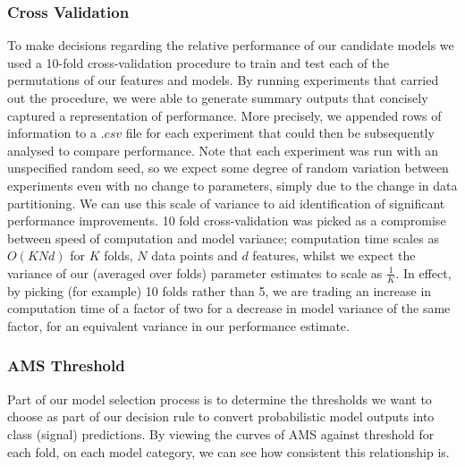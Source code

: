 \subsubsection{Cross Validation}
To make decisions regarding the relative performance of our candidate models we used a 10-fold cross-validation procedure to train and test each of the permutations of our features and models. By running experiments that carried out the procedure, we were able to generate summary outputs that concisely captured a representation of performance. More precisely, we appended rows of information to a $.csv$ file for each experiment that could then be subsequently analysed to compare performance. Note that each experiment was run with an unspecified random seed, so we expect some degree of random variation between experiments even with no change to parameters, simply due to the change in data partitioning. We can use this scale of variance to aid identification of significant performance improvements. 10 fold cross-validation was picked as a compromise between speed of computation and model variance; computation time scales as $O(KNd)$ for $K$ folds, $N$ data points and $d$ features, whilst we expect the variance of our (averaged over folds) parameter estimates to scale as $\frac{1}{K}$. In effect, by picking (for example) 10 folds rather than 5, we are trading an increase in computation time of a factor of two for a decrease in model variance of the same factor, for an equivalent variance in our performance estimate.

\subsubsection{AMS Threshold}
Part of our model selection process is to determine the thresholds we want to choose as part of our decision rule to convert probabilistic model outputs into class (signal) predictions. By viewing the curves of AMS against threshold for each fold, on each model category, we can see how consistent this relationship is.

